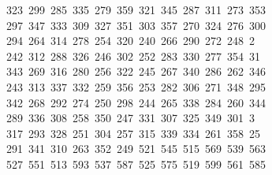 \begin{tabbing}
\>\ 323\ 299\ 285\ 335\ 279\ 359\ 321\ 345\ 287\ 311\ 273\ 353\\[0pt]
\>\ 297\ 347\ 333\ 309\ 327\ 351\ 303\ 357\ 270\ 324\ 276\ 300\ \\[0pt]
\ 294\ 264\ 314\ 278\ 254\ 320\ 240\ 266\ 290\ 272\ 248\ 2\\[0pt]
\ 242\ 312\ 288\ 326\ 246\ 302\ 252\ 283\ 330\ 277\ 354\ 31\\[0pt]
\ 343\ 269\ 316\ 280\ 256\ 322\ 245\ 267\ 340\ 286\ 262\ 346\\[0pt]
\>\ 243\ 313\ 337\ 332\ 259\ 356\ 253\ 282\ 306\ 271\ 348\ 295\\[0pt]
\>\ 342\ 268\ 292\ 274\ 250\ 298\ 244\ 265\ 338\ 284\ 260\ 344\ \\[0pt]
\ 289\ 336\ 308\ 258\ 350\ 247\ 331\ 307\ 325\ 349\ 301\ 3\\[0pt]
\ 317\ 293\ 328\ 251\ 304\ 257\ 315\ 339\ 334\ 261\ 358\ 25\\[0pt]
\ 291\ 341\ 310\ 263\ 352\ 249\ 521\ 545\ 515\ 569\ 539\ 563\\[0pt]
\>\ 527\ 551\ 513\ 593\ 537\ 587\ 525\ 575\ 519\ 599\ 561\ 585\\[0pt]

\end{tabbing}
